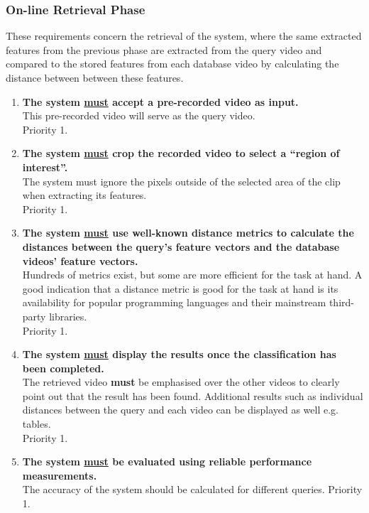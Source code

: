 \subsubsection{On-line Retrieval Phase}

These requirements concern the retrieval of the system, where the same extracted features from the previous phase are extracted from the query video and compared to the stored features from each database video by calculating the distance between between these features.

\begin{enumerate}[label=F\arabic*,resume]

    \item \textbf{The system \underline{must} accept a pre-recorded video as input.}\\
    This pre-recorded video will serve as the query video.\\
    Priority 1.
    
    \item \textbf{The system \underline{must} crop the recorded video to select a ``region of interest''.}\\
    The system must ignore the pixels outside of the selected area of the clip when extracting its features.\\
    Priority 1.
    
    \item \textbf{The system \underline{must} use well-known distance metrics to calculate the distances between the query's feature vectors and the database videos' feature vectors.}\\
    Hundreds of metrics exist, but some are more efficient for the task at hand. A good indication that a distance metric is good for the task at hand is its availability for popular programming languages and their mainstream third-party libraries.\\
    Priority 1.
    
    \item \textbf{The system \underline{must} display the results once the classification has been completed.}\\
    The retrieved video \textbf{must} be emphasised over the other videos to clearly point out that the result has been found. Additional results such as individual distances between the query and each video can be displayed as well e.g. tables.\\
    Priority 1.
    
    \item \textbf{The system \underline{must} be evaluated using reliable performance measurements.}\\
    The accuracy of the system should be calculated for different queries.
    Priority 1.
    

\end{enumerate}
